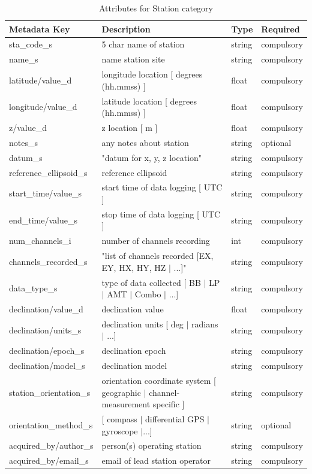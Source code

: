 \documentclass{article}
\begin{document}
\begin{table}[htb!]
	\caption[Attributes for Station]{Attributes for Station category}
	\begin{tabular}{|l|p{3in}|l|l|}
		\hline
		\textbf{Metadata Key} & \textbf{Description} & \textbf{Type} & \textbf{Required} \\ \hline
		sta\_code\_s & 5 char name of station & string & compulsory \\ \hline
		name\_s & name station site & string & compulsory \\ \hline
		latitude/value\_d & longitude location [ degrees (hh.mmss) ] & float & compulsory \\ \hline
		longitude/value\_d & latitude location [ degrees (hh.mmss) ] & float & compulsory \\ \hline
		z/value\_d & z location [ m ] & float & compulsory \\ \hline
		notes\_s & any notes about station & string & optional \\ \hline
		datum\_s & "datum for x, y, z location" & string & compulsory \\ \hline
		reference\_ellipsoid\_s & reference ellipsoid & string & compulsory \\ \hline
		start\_time/value\_s & start time of data logging [ UTC ] & string & compulsory \\ \hline
		end\_time/value\_s & stop time of data logging  [ UTC ] & string & compulsory \\ \hline
		num\_channels\_i & number of channels recording & int & compulsory \\ \hline
		channels\_recorded\_s & "list of channels recorded [EX, EY, HX, HY, HZ $|$ ...]" & string & compulsory \\ \hline
		data\_type\_s & type of data collected [ BB $|$ LP $|$ AMT $|$ Combo $|$ ...] & string & compulsory \\ \hline
		declination/value\_d & declination value & float & compulsory \\ \hline
		declination/units\_s & declination units [ deg $|$ radians $|$ ...] & string & compulsory \\ \hline
		declination/epoch\_s & declination epoch & string & compulsory \\ \hline
		declination/model\_s & declination model & string & compulsory \\ \hline
		station\_orientation\_s & orientation coordinate system [ geographic $|$ channel-measurement specific ] & string & compulsory \\ \hline
		orientation\_method\_s & [ compass $|$ differential GPS $|$ gyroscope $|$...] & string & optional \\ \hline
		acquired\_by/author\_s & person(s) operating station & string & compulsory \\ \hline
		acquired\_by/email\_s & email of lead station operator & string & compulsory \\ \hline
	\end{tabular}
\label{tab:station01}
\end{table}	
\end{document}
